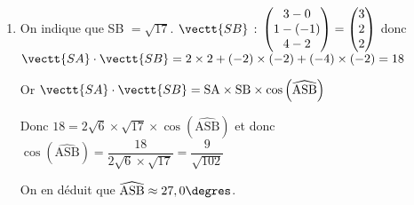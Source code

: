 \begin{enumerate}
\begin{enumerate}
		\item On indique que SB $= \sqrt{17}$. $\vectt{SB}\,:\,
\begin{pmatrix}
3-0 \\1-(-1)\\4-2
\end{pmatrix}
=
\begin{pmatrix}
3 \\2\\2
\end{pmatrix}$
donc
$\vectt{SA}\cdot \vectt{SB} = 2\times 2 + (-2)\times (-2) + (-4)\times (-2)=18$

Or $\vectt{SA}\cdot \vectt{SB} = \text{SA}\times \text{SB}\times \cos \left ( \widehat{\text{ASB}}\right )$

Donc $18 = 2\sqrt{6} \times \sqrt{17} \times \cos \left ( \widehat{\text{ASB}}\right )$
et donc
$\cos \left ( \widehat{\text{ASB}}\right ) = \dfrac{18}{2\sqrt{6} \times \sqrt{17}}
= \dfrac{9}{\sqrt{102}}$

On en déduit que $\widehat{\text{ASB}} \approx 27,0\degres$.

	\end{enumerate}
\end{enumerate}

\bigskip

